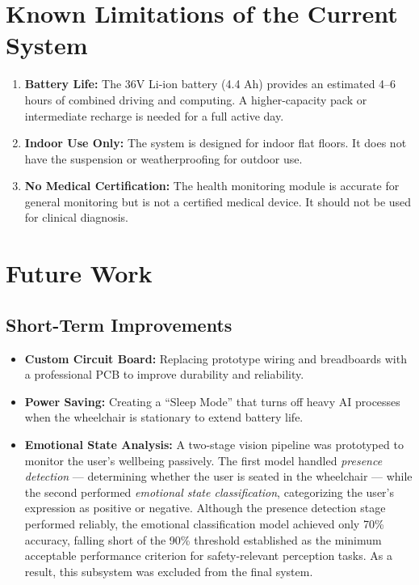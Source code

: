 \documentclass[12pt,a4paper]{report}
\begin{document}
\section{Known Limitations of the Current System}

\begin{enumerate}
    
    \item \textbf{Battery Life:} The 36V Li-ion battery (4.4 Ah) provides an estimated 4--6 hours of combined driving and computing. A higher-capacity pack or intermediate recharge is needed for a full active day.
    \item \textbf{Indoor Use Only:} The system is designed for indoor flat floors. It does not have the suspension or weatherproofing for outdoor use.
    \item \textbf{No Medical Certification:} The health monitoring module is accurate for general monitoring but is not a certified medical device. It should not be used for clinical diagnosis.
\end{enumerate}

\section{Future Work}

\subsection{Short-Term Improvements}
\begin{itemize}
    \item \textbf{Custom Circuit Board:} Replacing prototype wiring and breadboards with a professional PCB to improve durability and reliability.
    \item \textbf{Power Saving:} Creating a ``Sleep Mode'' that turns off heavy AI processes when the wheelchair is stationary to extend battery life.
    \item \textbf{Emotional State Analysis:} A two-stage vision pipeline was prototyped to monitor the user's wellbeing passively. The first model handled \textit{presence detection} --- determining whether the user is seated in the wheelchair --- while the second performed \textit{emotional state classification}, categorizing the user's expression as positive or negative. Although the presence detection stage performed reliably, the emotional classification model achieved only 70\% accuracy, falling short of the 90\% threshold established as the minimum acceptable performance criterion for safety-relevant perception tasks. As a result, this subsystem was excluded from the final system.
\end{itemize}
\end{document}
